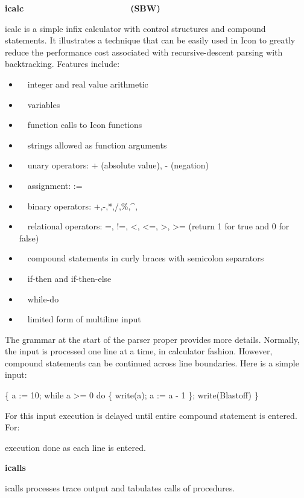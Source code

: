{{\sffamily\bfseries
icalc\ \ \ \ \ \ \ \ \ \ \ \ \ \ \ \ \ \ \ \ \ \ (SBW)}

\textsf{icalc} is a simple infix calculator with control structures and
compound statements. It illustrates a technique that can be easily used
in Icon to greatly reduce the performance cost associated with
recursive-descent parsing with backtracking.
Features include:

\begin{itemize}
\item \ \ integer and real value arithmetic
\item \ \ variables
\item \ \ function calls to Icon functions
\item \ \ strings allowed as function arguments
\item \ \ unary operators: + (absolute value), - (negation)
\item \ \ assignment: :=
\item \ \ binary operators: +,-,*,/,\%,\^{},
\item \ \ relational operators: =, !=, {\textless}, {\textless}=,
{\textgreater}, {\textgreater}= (return 1 for true and 0 for false)
\item \ \ compound statements in curly braces with semicolon separators
\item \ \ if-then and if-then-else
\item \ \ while-do
\item \ \ limited form of multiline input
\end{itemize}
The grammar at the start of the {\textquotedbl}parser{\textquotedbl}
proper provides more details. Normally, the input is processed one line
at a time, in calculator fashion. However, compound statements can be
continued across line boundaries. Here is a simple input:

{\sffamily
\{ a := 10; while a {\textgreater}= 0 do \{ write(a); a := a - 1 \};
write({\textquotedbl}Blastoff{\textquotedbl}) \}}

For this input execution is delayed until entire compound statement is
entered. For:



execution done as each line is entered. 

{\sffamily\bfseries
icalls\ \ \ \ \ \ \ \ \ \ \ \ \ \ \ \ \ \ \ \ \ \ }

\textsf{icalls} processes trace output and tabulates calls of
procedures.

}
